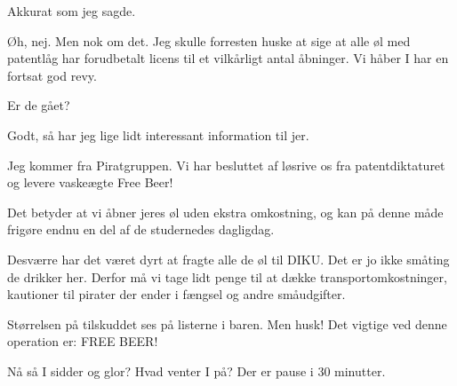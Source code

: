 \documentclass[a4paper,11pt]{article}
\begin{document}
\begin{sketch}
 Akkurat som jeg sagde.

 Øh, nej. Men nok om det. Jeg skulle forresten huske at sige at alle øl med patentlåg har forudbetalt
         licens til et vilkårligt antal åbninger.
         Vi håber I har en fortsat god revy. 

  Er de gået?

 Godt, så har jeg lige lidt interessant information til jer.

 Jeg kommer fra Piratgruppen. Vi har besluttet af løsrive os fra patentdiktaturet og levere vaskeægte
         Free Beer!

 Det betyder at vi åbner jeres øl uden ekstra omkostning, og kan på denne måde frigøre endnu en del af
         de studernedes dagligdag.

          Desværre har det været dyrt at fragte alle de øl til
         DIKU. Det er jo ikke småting de drikker her.  Derfor må vi
         tage lidt penge til at dække transportomkostninger, kautioner
         til pirater der ender i fængsel og andre småudgifter.

 Størrelsen på tilskuddet ses på listerne i baren. Men husk! Det vigtige ved denne operation er:
         FREE BEER! 

  Nå så I sidder og glor?
         Hvad venter I på? Der er pause i 30 minutter.


\end{sketch}
\end{document}
